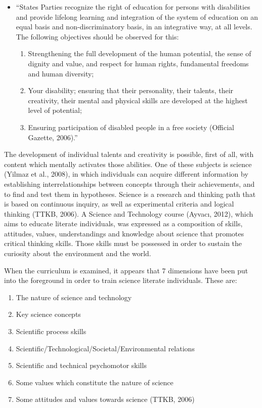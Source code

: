 \documentclass[11.5pt]{sig-alternate} %
\begin{document}
\begin{large}
\begin{itemize}
    \item “States Parties recognize the right of education for persons with disabilities and provide lifelong learning and integration of the system of education on an equal basis and non-discriminatory basis, in an integrative way, at all levels. The following objectives should be observed for this:
\begin{enumerate} [label=\alph*.]
    \item  Strengthening the full development of the human potential, the sense of dignity and value, and respect for human rights, fundamental freedoms and human diversity;
    \item  Your disability; ensuring that their personality, their talents, their creativity, their mental and physical skills are developed at the highest level of potential;
    \item  Ensuring participation of disabled people in a free society (Official Gazette, 2006).”
\end{enumerate}
\end{itemize}

The development of individual talents and creativity is possible, first of all, with content which mentally activates those abilities. One of these subjects is science (Yilmaz et al., 2008), in which individuals can acquire different information by establishing interrelationships between concepts through their achievements, and to find and test them in hypotheses. Science is a research and thinking path that is based on continuous inquiry, as well as experimental criteria and logical thinking (TTKB, 2006). A Science and Technology course (Ayvacı, 2012), which aims to educate literate individuals, was expressed as a composition of skills, attitudes, values, understandings and knowledge about science that promotes critical thinking skills. Those skills must be possessed in order to sustain the curiosity about the environment and the world.

When the curriculum is examined, it appears that 7 dimensions have been put into the foreground in order to train science literate individuals. These are:

 \begin{enumerate}
     \item The nature of science and technology
     \item Key science concepts
     \item Scientific process skills
     \item Scientific/Technological/Societal/Environmental relations
     \item Scientific and technical psychomotor skills
     \item Some values which constitute the nature of science
     \item Some attitudes and values towards science (TTKB, 2006)
 \end{enumerate}


\end{large}
\end{document}
